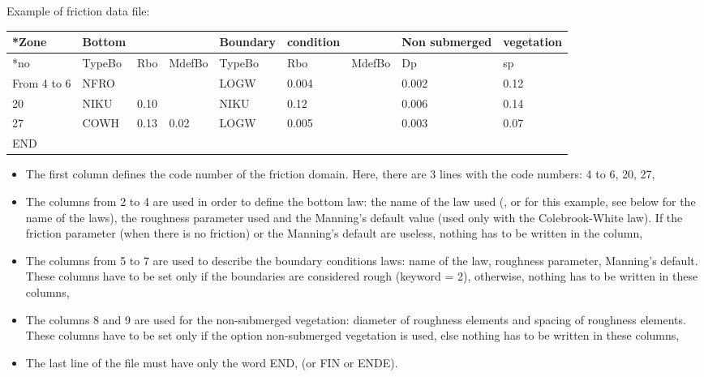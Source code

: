 Example of friction data file:



\begin{tabular}{|p{0.4in}|p{0.5in}|p{0.3in}|p{0.5in}|p{0.6in}|p{0.5in}|p{0.5in}|p{0.6in}|p{0.6in}|} \hline
*Zone & Bottom &  &  & Boundary & condition &  & Non submerged & vegetation \\ \hline
*no & TypeBo & Rbo & MdefBo & TypeBo & Rbo & MdefBo & Dp & sp \\ \hline
From 4 to 6 & NFRO &  &  & LOGW & 0.004 &  & 0.002 & 0.12 \\ \hline
20 & NIKU & 0.10 &  & NIKU & 0.12 &  & 0.006 & 0.14 \\ \hline
27 & COWH & 0.13 & 0.02 & LOGW & 0.005 &  & 0.003 & 0.07 \\ \hline
END &  &  &  &  &  &  &  &  \\ \hline
\end{tabular}


\begin{itemize}
\item The first column defines the code number of the friction domain.
Here, there are 3 lines with the code numbers: 4 to 6, 20, 27,

\item The columns from 2 to 4 are used in order to define the bottom law:
the name of the law used (,  or  for this
example, see below for the name of the laws),
the roughness parameter used and the Manning's default value
(used only with the Colebrook-White law).
If the friction parameter (when there is no friction) or the Manning's default
are useless, nothing has to be written in the column,

\item The columns from 5 to 7 are used to describe the boundary conditions laws:
name of the law, roughness parameter, Manning's default.
These columns have to be set only if the boundaries are considered rough
(keyword  = 2), otherwise,
nothing has to be written in these columns,

\item The columns 8 and 9 are used for the non-submerged vegetation:
diameter of roughness elements and spacing of roughness elements.
These columns have to be set only if the option non-submerged vegetation is used,
else nothing has to be written in these columns,

\item The last line of the file must have only the word END, (or FIN or ENDE).
\end{itemize}

